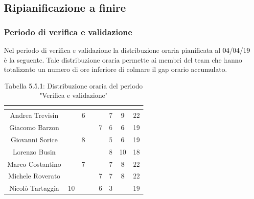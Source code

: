 \subsection{Ripianificazione a finire}

\subsubsection{Periodo di verifica e validazione}
Nel periodo di verifica e validazione la distribuzione oraria pianificata al 04/04/19 è la seguente.
Tale distribuzione oraria permette ai membri del team che hanno totalizzato un numero di ore inferiore di colmare il gap orario accumulato.

\renewcommand{\arraystretch}{1.5}
\begin{table}[H]
\begin{center}
\begin{tabular}{|c|c|c|c|c|c|c|c|}
\hline
\rowcolor{title_row}
\textbf{\color{title_text}{Nome}} & \textbf{\color{title_text}{Resp.}} & \textbf{\color{title_text}{Ammi.}} & \textbf{\color{title_text}{Analist.}} & \textbf{\color{title_text}{Progett.}} & \textbf{\color{title_text}{Program.}} & \textbf{\color{title_text}{Verific.}} & \textbf{\color{title_text}{Totale}} \\ \hline
Andrea Trevisin  & & 6 & & & 7 & 9 & 22  \\ \hline
Giacomo Barzon   & & & & 7 & 6 & 6 & 19  \\ \hline
Giovanni Sorice  & & 8 & &  & 5 & 6 & 19  \\ \hline
Lorenzo Busin    & & & & & 8 & 10 & 18  \\ \hline
Marco Costantino & & 7 & & & 7 & 8 & 22  \\ \hline
Michele Roverato & & & & 7 & 7 & 8 & 22  \\ \hline
Nicolò Tartaggia & 10 & & & 6 & 3 & & 19  \\ \hline
\end{tabular}
\caption{Tabella 5.5.1: Distribuzione oraria del periodo "Verifica e validazione"\label{}}
\end{center}
\end{table}
\renewcommand{\arraystretch}{1}

